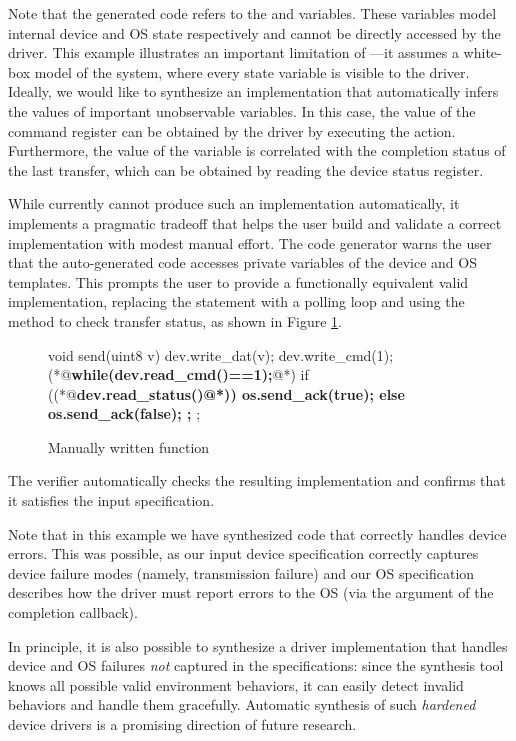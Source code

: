 Note that the generated code refers to the  and  variables.  These variables model internal device and OS state respectively and cannot be directly accessed by the driver.  This example illustrates an important limitation of \termite---it assumes a white-box model of the system, where every state variable is visible to the driver.  Ideally, we would like to synthesize an implementation that automatically infers the values of important unobservable variables.  In this case, the value of the command register can be obtained by the driver by executing the  action.  Furthermore, the value of the  variable is correlated with the completion status of the last transfer, which can be obtained by reading the device status register.

While \termite currently cannot produce such an implementation automatically, it implements a pragmatic tradeoff that helps the user build and validate a correct implementation with modest manual effort.  The code generator warns the user that the auto-generated code accesses  private variables of the device and OS templates.  This prompts the user to provide a functionally equivalent valid implementation, replacing the  statement with a polling loop and using the  method to check transfer status, as shown in Figure \ref{f:ex_man_send}.

\begin{figure}
\begin{tsllisting}
void send(uint8 v){
    dev.write_dat(v);
    dev.write_cmd(1);
    (*@{\bf\ttfamily while(dev.read\_cmd()==1){};}@*)
    if ((*@\bf\ttfamily dev.read\_status()@*)) {
        os.send_ack(true);
    } else {
        os.send_ack(false);
    };
};
\end{tsllisting}
\caption{Manually written  function}
\label{f:ex_man_send}
\end{figure}

The verifier automatically checks the resulting implementation and confirms that it satisfies the input specification.

Note that in this example we have synthesized code that correctly handles device errors.  This was possible, as our input device specification correctly captures device failure modes (namely, transmission failure) and our OS specification describes how the driver must report errors to the OS (via the  argument of the completion callback).

In principle, it is also possible to synthesize a driver implementation that handles device and OS failures \emph{not} captured in the specifications: since the synthesis tool knows all possible valid environment behaviors, it can easily detect invalid behaviors and handle them gracefully.  Automatic synthesis of such \emph{hardened} device drivers is a promising direction of future research.

